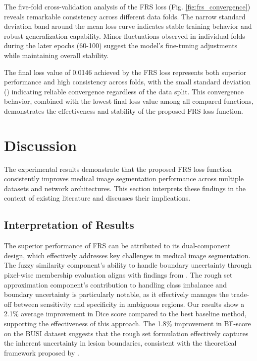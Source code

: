 \documentclass[review]{elsarticle}
\begin{document}
The five-fold cross-validation analysis of the FRS loss (Fig. \ref{fig:frs_convergence}) reveals remarkable consistency across different data folds. The narrow standard deviation band around the mean loss curve indicates stable training behavior and robust generalization capability. Minor fluctuations observed in individual folds during the later epochs (60-100) suggest the model's fine-tuning adjustments while maintaining overall stability.

The final loss value of 0.0146  achieved by the FRS loss represents both superior performance and high consistency across folds, with the small standard deviation () indicating reliable convergence regardless of the data split. This convergence behavior, combined with the lowest final loss value among all compared functions, demonstrates the effectiveness and stability of the proposed FRS loss function.
\section{Discussion}\label{discussion}

The experimental results demonstrate that the proposed FRS loss function consistently improves medical image segmentation performance across multiple datasets and network architectures. This section interprets these findings in the context of existing literature and discusses their implications.

\subsection{Interpretation of Results}

The superior performance of FRS can be attributed to its dual-component design, which effectively addresses key challenges in medical image segmentation. The fuzzy similarity component's ability to handle boundary uncertainty through pixel-wise membership evaluation aligns with findings from \cite{Hong2019}. The rough set approximation component's contribution to handling class imbalance and boundary uncertainty is particularly notable, as it effectively manages the trade-off between sensitivity and specificity in ambiguous regions. Our results show a 2.1\% average improvement in Dice score compared to the best baseline method, supporting the effectiveness of this approach. The 1.8\% improvement in BF-score on the BUSI dataset suggests that the rough set formulation effectively captures the inherent uncertainty in lesion boundaries, consistent with the theoretical framework proposed by \cite{Cock2007}.
\end{document}
